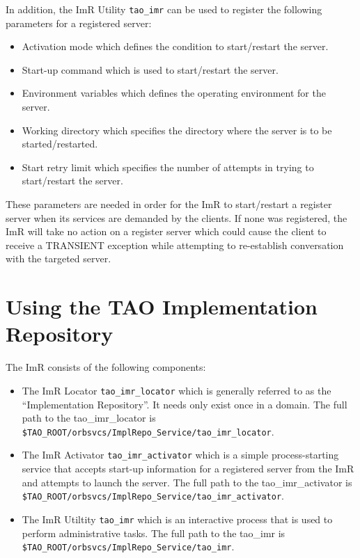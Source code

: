 In addition, the ImR Utility {\tt tao\_imr} can be used to register the
following parameters for a registered server:
\begin{itemize}
     \item Activation mode which defines the condition to start/restart the server.
     \item Start-up command which is used to start/restart the server.
     \item Environment variables which defines the operating environment
              for the server.
     \item Working directory which specifies the directory where the server
               is to be started/restarted.
     \item Start retry limit which specifies the number of attempts in trying
               to start/restart the server.
\end{itemize}

These parameters are needed in order for the ImR to start/restart
a register server when its services are demanded by the clients.  If none
was registered, the ImR will take no action on a register server
which could cause the client  to receive a TRANSIENT exception
while attempting to re-establish conversation with the  targeted server.

\section{Using the TAO Implementation Repository}

The ImR consists of  the following components:
\begin{itemize}
    \item The ImR Locator {\tt tao\_imr\_locator} which is generally
              referred to as the “Implementation Repository”.  It needs only exist
              once in  a domain.  The full path to the tao\_imr\_locator is
              {\tt \$TAO\_ROOT/orbsvcs/ImplRepo\_Service/tao\_imr\_locator}.
    \item The ImR Activator {\tt tao\_imr\_activator} which is a
              simple process-starting service that accepts start-up information
              for a registered server from the ImR and attempts to launch
              the server.  The full path to the tao\_imr\_activator is
              {\tt \$TAO\_ROOT/orbsvcs/ImplRepo\_Service/tao\_imr\_activator}.
    \item The ImR Utiltity {\tt tao\_imr} which is an interactive
              process that is used to perform administrative tasks.  The full path to
              the tao\_imr is {\tt \$TAO\_ROOT/orbsvcs/ImplRepo\_Service/tao\_imr}.
\end{itemize}


